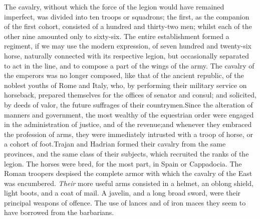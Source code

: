 The cavalry, without which the force of the legion would have
remained imperfect, was divided into ten troops or squadrons; the
first, as the companion of the first cohort, consisted of a
hundred and thirty-two men; whilst each of the other nine
amounted only to sixty-six. The entire establishment formed a
regiment, if we may use the modern expression, of seven hundred
and twenty-six horse, naturally connected with its respective
legion, but occasionally separated to act in the line, and to
compose a part of the wings of the army. \footnotemark[50] The cavalry of the
emperors was no longer composed, like that of the ancient
republic, of the noblest youths of Rome and Italy, who, by
performing their military service on horseback, prepared
themselves for the offices of senator and consul; and solicited,
by deeds of valor, the future suffrages of their countrymen.\footnotemark[51]
Since the alteration of manners and government, the most wealthy
of the equestrian order were engaged in the administration of
justice, and of the revenue;\footnotemark[52] and whenever they embraced the
profession of arms, they were immediately intrusted with a troop
of horse, or a cohort of foot.\footnotemark[53] Trajan and Hadrian formed their
cavalry from the same provinces, and the same class of their
subjects, which recruited the ranks of the legion. The horses
were bred, for the most part, in Spain or Cappadocia. The Roman
troopers despised the complete armor with which the cavalry of
the East was encumbered. \textit{Their} more useful arms consisted in a
helmet, an oblong shield, light boots, and a coat of mail. A
javelin, and a long broad sword, were their principal weapons of
offence. The use of lances and of iron maces they seem to have
borrowed from the barbarians.\footnotemark[54]




